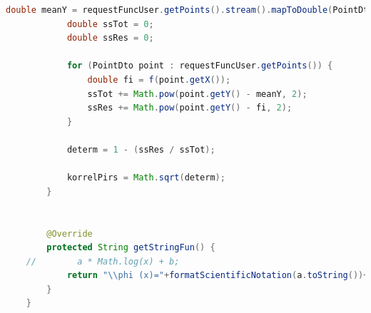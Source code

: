 \documentclass{article}
\begin{document}
\begin{lstlisting}[language=Java, caption={Логарифмическая аппроксимация}]
            double meanY = requestFuncUser.getPoints().stream().mapToDouble(PointDto::getY).average().orElse(0);
            double ssTot = 0;
            double ssRes = 0;
    
            for (PointDto point : requestFuncUser.getPoints()) {
                double fi = f(point.getX());
                ssTot += Math.pow(point.getY() - meanY, 2);
                ssRes += Math.pow(point.getY() - fi, 2);
            }
    
            determ = 1 - (ssRes / ssTot);
    
            korrelPirs = Math.sqrt(determ);
        }
    

        @Override
        protected String getStringFun() {
    //        a * Math.log(x) + b;
            return "\\phi (x)="+formatScientificNotation(a.toString())+"\\cdot ln(x)+"+formatScientificNotation(b.toString());
        }
    }
    
    
\end{lstlisting}
\end{document}
